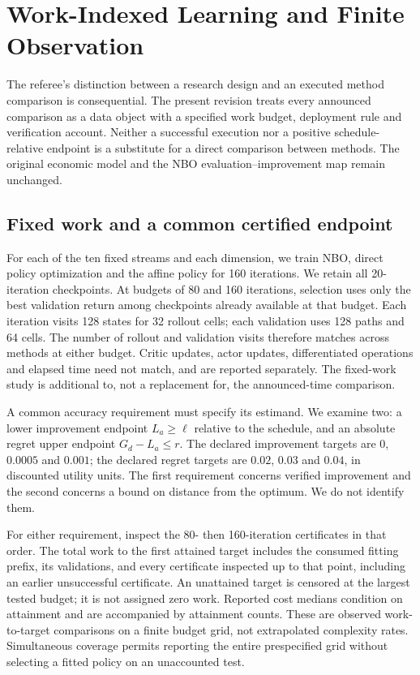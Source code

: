 \section{Work-Indexed Learning and Finite Observation}\label{sec:r13work}
The referee's distinction between a research design and an executed method comparison is consequential. The present revision treats every announced comparison as a data object with a specified work budget, deployment rule and verification account. Neither a successful execution nor a positive schedule-relative endpoint is a substitute for a direct comparison between methods. The original economic model and the NBO evaluation--improvement map remain unchanged.

\subsection{Fixed work and a common certified endpoint}\label{sec:r13accuracy}
For each of the ten fixed streams and each dimension, we train NBO, direct policy optimization and the affine policy for 160 iterations. We retain all 20-iteration checkpoints. At budgets of 80 and 160 iterations, selection uses only the best validation return among checkpoints already available at that budget. Each iteration visits 128 states for 32 rollout cells; each validation uses 128 paths and 64 cells. The number of rollout and validation visits therefore matches across methods at either budget. Critic updates, actor updates, differentiated operations and elapsed time need not match, and are reported separately. The fixed-work study is additional to, not a replacement for, the announced-time comparison.




A common accuracy requirement must specify its estimand. We examine two: a lower improvement endpoint $L_a\geq\ell$ relative to the schedule, and an absolute regret upper endpoint $G_d-L_a\leq r$. The declared improvement targets are $0$, $0.0005$ and $0.001$; the declared regret targets are $0.02$, $0.03$ and $0.04$, in discounted utility units. The first requirement concerns verified improvement and the second concerns a bound on distance from the optimum. We do not identify them.

For either requirement, inspect the 80- then 160-iteration certificates in that order. The total work to the first attained target includes the consumed fitting prefix, its validations, and every certificate inspected up to that point, including an earlier unsuccessful certificate. An unattained target is censored at the largest tested budget; it is not assigned zero work. Reported cost medians condition on attainment and are accompanied by attainment counts. These are observed work-to-target comparisons on a finite budget grid, not extrapolated complexity rates. Simultaneous coverage permits reporting the entire prespecified grid without selecting a fitted policy on an unaccounted test.

